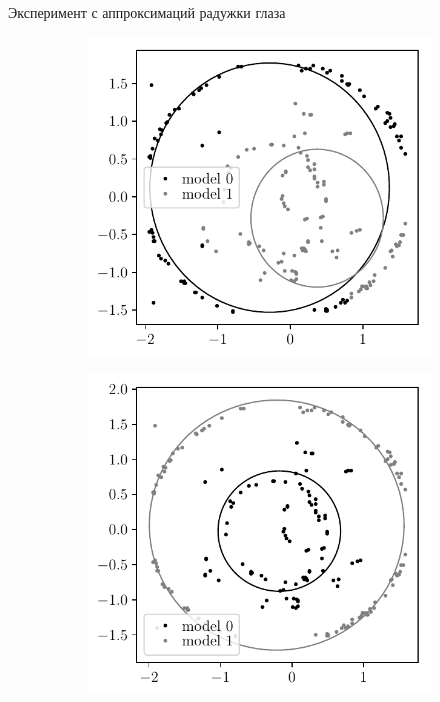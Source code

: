 \documentclass[10pt,pdf,hyperref={unicode}]{beamer}
\begin{document}
\begin{frame}{Эксперимент с аппроксимаций радужки глаза}
\justifying

\begin{figure}
     \centering
     \begin{subfigure}[b]{0.3\textwidth}
         \centering
         \includegraphics[width=\textwidth]{figures/not_prior_real_example}
         \caption{}
     \end{subfigure}
     \begin{subfigure}[b]{0.3\textwidth}
         \centering
         \includegraphics[width=\textwidth]{figures/prior_real_example}

\end{subfigure}
\end{figure}
\end{frame}
\end{document}
